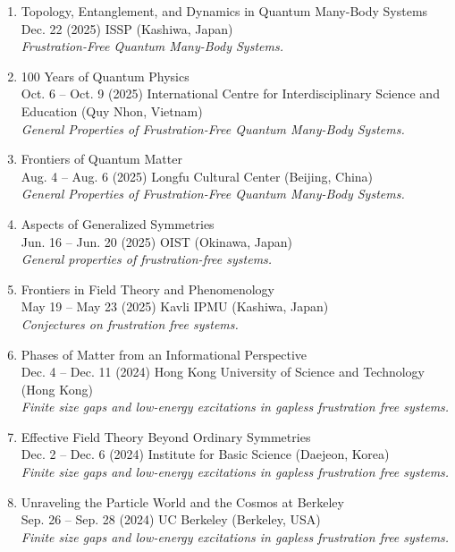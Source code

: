 \documentclass[letterpaper,11pt]{article}
\begin{document}
\begin{enumerate}
\item Topology, Entanglement, and Dynamics
in Quantum Many-Body Systems\\
Dec. 22  (2025) ISSP (Kashiwa, Japan)\\
\emph{Frustration-Free Quantum Many-Body Systems.}

\item 100 Years of Quantum Physics\\
Oct. 6 -- Oct. 9 (2025) International Centre for Interdisciplinary Science and Education (Quy Nhon, Vietnam)\\
\emph{General Properties of Frustration-Free Quantum Many-Body Systems.}

\item Frontiers of Quantum Matter\\
Aug. 4 -- Aug. 6 (2025) Longfu Cultural Center (Beijing, China)\\
\emph{General Properties of Frustration-Free Quantum Many-Body Systems.}

\item Aspects of Generalized Symmetries\\
Jun. 16 -- Jun. 20 (2025) OIST (Okinawa, Japan)\\
\emph{General properties of frustration-free systems.}

\item Frontiers in Field Theory and Phenomenology\\
May 19 -- May 23 (2025) Kavli IPMU (Kashiwa, Japan)\\
\emph{Conjectures on frustration free systems.}

\item Phases of Matter from an Informational Perspective\\
Dec. 4 -- Dec. 11 (2024) Hong Kong University of Science and Technology (Hong Kong)\\
\emph{Finite size gaps and low-energy excitations in gapless frustration free systems.}

\item Effective Field Theory Beyond Ordinary Symmetries\\
Dec. 2 -- Dec. 6 (2024) Institute for Basic Science (Daejeon, Korea)\\
\emph{Finite size gaps and low-energy excitations in gapless frustration free systems.}

\item Unraveling the Particle World and the Cosmos at Berkeley\\
Sep. 26 -- Sep. 28 (2024) UC Berkeley (Berkeley, USA)\\
\emph{Finite size gaps and low-energy excitations in gapless frustration free systems.}


\end{enumerate}
\end{document}
